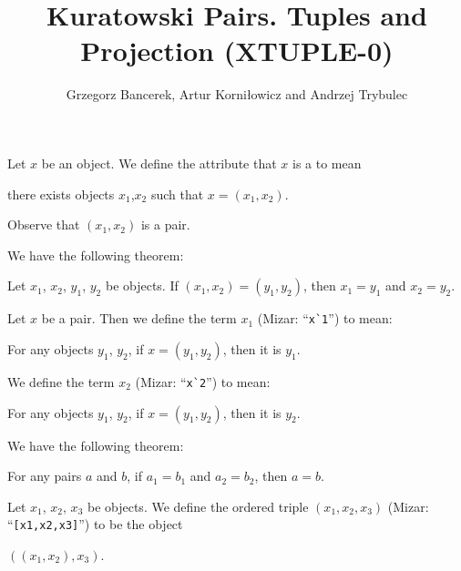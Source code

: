 \documentclass{article}
\title{Kuratowski Pairs. Tuples and Projection (XTUPLE-0)}
\author{Grzegorz Bancerek, Artur Korni\l owicz and Andrzej Trybulec}
\begin{document}
\maketitle

\begin{definition}
Let $x$ be an object. We define the attribute that $x$ is a
 to mean
\begin{defn}
\item there exists objects $x_{1}$,$x_{2}$ such that $x=(x_{1},x_{2})$.
\end{defn}
Observe that $(x_{1},x_{2})$ is a pair.
\end{definition}

We have the following theorem:
\begin{thm}
\item\label{xtuple0:1} Let $x_{1}$, $x_{2}$, $y_{1}$, $y_{2}$ be objects. If
  $(x_{1},x_{2})=(y_{1},y_{2})$, then $x_{1}=y_{1}$ and $x_{2}=y_{2}$.
\end{thm}

\begin{definition}
Let $x$ be a pair. Then we define the term $x_{1}$ (Mizar:
``\verb#x`1#'') to mean:
\begin{defn}
\item For any objects $y_{1}$, $y_{2}$, if $x=(y_{1},y_{2})$, then it is $y_{1}$.
\end{defn}
We define the term $x_{2}$ (Mizar: ``\verb#x`2#'') to mean:
\begin{defn}
\item For any objects $y_{1}$, $y_{2}$, if $x=(y_{1},y_{2})$, then it is $y_{2}$.
\end{defn}
\end{definition}


We have the following theorem:
\begin{thm}
\item\label{xtuple0:2} For any pairs $a$ and $b$, if $a_{1}=b_{1}$ and
  $a_{2}=b_{2}$, then $a=b$. 
\end{thm}


\begin{definition}
Let $x_{1}$, $x_{2}$, $x_{3}$ be objects. We define the ordered triple
$(x_{1},x_{2},x_{3})$ (Mizar: ``\verb#[x1,x2,x3]#'') to be the object
\begin{defn}
\item $((x_{1},x_{2}),x_{3})$.
\end{defn}
\end{definition}
\end{document}
